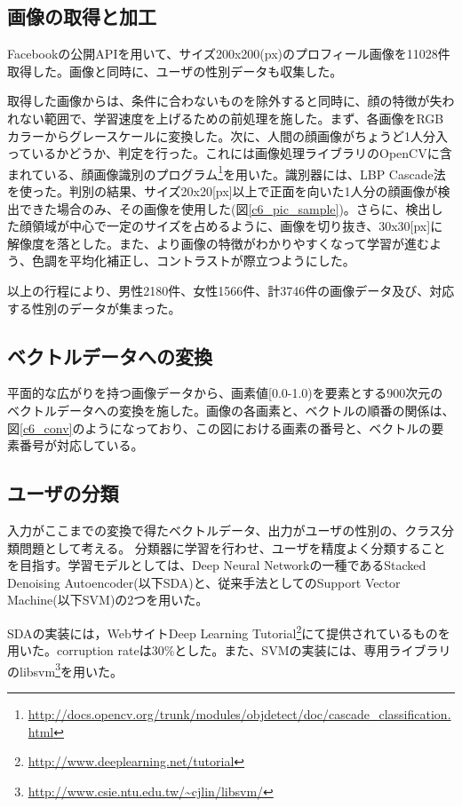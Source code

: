\subsection{画像の取得と加工}
Facebookの公開APIを用いて、サイズ200x200(px)のプロフィール画像を11028件取得した。画像と同時に、ユーザの性別データも収集した。\par
取得した画像からは、条件に合わないものを除外すると同時に、顔の特徴が失われない範囲で、学習速度を上げるための前処理を施した。まず、各画像をRGBカラーからグレースケールに変換した。次に、人間の顔画像がちょうど1人分入っているかどうか、判定を行った。これには画像処理ライブラリのOpenCVに含まれている、顔画像識別のプログラム\footnote{\url{http://docs.opencv.org/trunk/modules/objdetect/doc/cascade_classification.html}}を用いた。識別器には、LBP Cascade法\cite{liao2007learning}を使った。判別の結果、サイズ20x20[px]以上で正面を向いた1人分の顔画像が検出できた場合のみ、その画像を使用した(図\ref{c6_pic_sample})。さらに、検出した顔領域が中心で一定のサイズを占めるように、画像を切り抜き、30x30[px]に解像度を落とした。また、より画像の特徴がわかりやすくなって学習が進むよう、色調を平均化補正し、コントラストが際立つようにした。\par
以上の行程により、男性2180件、女性1566件、計3746件の画像データ及び、対応する性別のデータが集まった。
\subsection{ベクトルデータへの変換}
平面的な広がりを持つ画像データから、画素値[0.0-1.0)を要素とする900次元のベクトルデータへの変換を施した。画像の各画素と、ベクトルの順番の関係は、図\ref{c6_conv}のようになっており、この図における画素の番号と、ベクトルの要素番号が対応している。
\subsection{ユーザの分類}
入力がここまでの変換で得たベクトルデータ、出力がユーザの性別の、クラス分類問題として考える。
分類器に学習を行わせ、ユーザを精度よく分類することを目指す。学習モデルとしては、Deep Neural Networkの一種であるStacked Denoising Autoencoder(以下SDA)と、従来手法としてのSupport Vector Machine(以下SVM)の2つを用いた。\par
SDAの実装には，WebサイトDeep Learning Tutorial\footnote{\url{http://www.deeplearning.net/tutorial}}にて提供されているものを用いた。corruption rateは30\%とした。また、SVMの実装には、専用ライブラリのlibsvm\footnote{\url{http://www.csie.ntu.edu.tw/~cjlin/libsvm/}}を用いた。
\par

